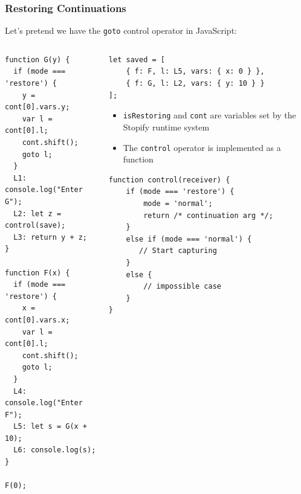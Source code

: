 \documentclass[8pt,pdf,handout]{beamer}
\begin{document}
\begin{frame}[fragile]
\frametitle{Restoring Continuations}

\begin{alertblock}{}
Let's pretend we have the \lstinline|goto| control operator in JavaScript:
\end{alertblock}

\begin{columns}

\begin{column}{0.40\textwidth}

\begin{lstlisting}
function G(y) {
  if (mode === 'restore') {
    y = cont[0].vars.y;
    var l = cont[0].l;
    cont.shift();
    goto l;
  }
  L1: console.log("Enter G");
  L2: let z = control(save);
  L3: return y + z;
}

function F(x) {
  if (mode === 'restore') {
    x = cont[0].vars.x;
    var l = cont[0].l;
    cont.shift();
    goto l;
  }
  L4: console.log("Enter F");
  L5: let s = G(x + 10);
  L6: console.log(s);
}

F(0);
\end{lstlisting}

\end{column}

\begin{column}{0.55\textwidth}

\begin{lstlisting}
let saved = [
    { f: F, l: L5, vars: { x: 0 } },
    { f: G, l: L2, vars: { y: 10 } }
];
\end{lstlisting}

\begin{itemize}

    \item \lstinline|isRestoring| and \lstinline|cont| are variables set by
    the Stopify runtime system

    \pause

    \item The \lstinline|control| operator is implemented
    as a function
\end{itemize}

\begin{lstlisting}
function control(receiver) {
    if (mode === 'restore') {
        mode = 'normal';
        return /* continuation arg */;
    }
    else if (mode === 'normal') {
       // Start capturing
    }
    else {
        // impossible case
    }
}
\end{lstlisting}

\end{column}
\end{columns}

\end{frame}
\end{document}
